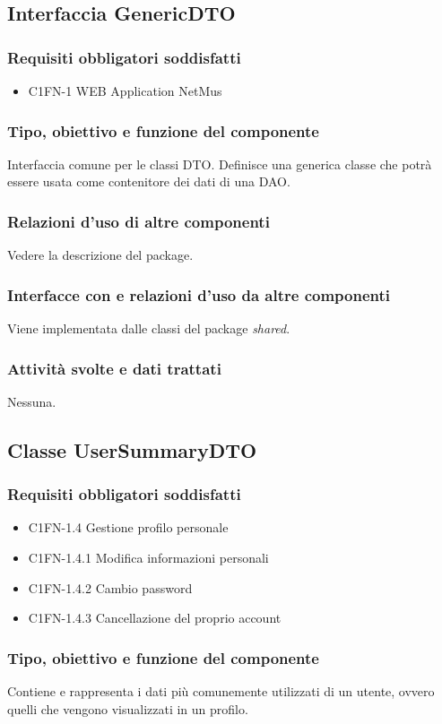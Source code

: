 \subsection{Interfaccia GenericDTO}
\subsubsection*{Requisiti obbligatori soddisfatti}
\begin{itemize}
	\item C1FN-1 WEB Application NetMus
\end{itemize}
\subsubsection*{Tipo, obiettivo e funzione del componente}
Interfaccia comune per le classi DTO. Definisce una generica classe che potr\`a
essere usata come contenitore dei dati di una DAO.
\subsubsection*{Relazioni d'uso di altre componenti}
Vedere la descrizione del package.
\subsubsection*{Interfacce con e relazioni d'uso da altre componenti}
Viene implementata dalle classi del package \emph{shared}.
\subsubsection*{Attivit\`a svolte e dati trattati}
Nessuna. 

\subsection{Classe UserSummaryDTO}
\subsubsection*{Requisiti obbligatori soddisfatti}
\begin{itemize}
	\item C1FN-1.4 Gestione profilo personale
	\item C1FN-1.4.1 Modifica informazioni personali
	\item C1FN-1.4.2 Cambio password
	\item C1FN-1.4.3 Cancellazione del proprio account
\end{itemize}
\subsubsection*{Tipo, obiettivo e funzione del componente}
Contiene e rappresenta i dati pi\`u comunemente utilizzati di un utente, ovvero
quelli che vengono visualizzati in un profilo.
